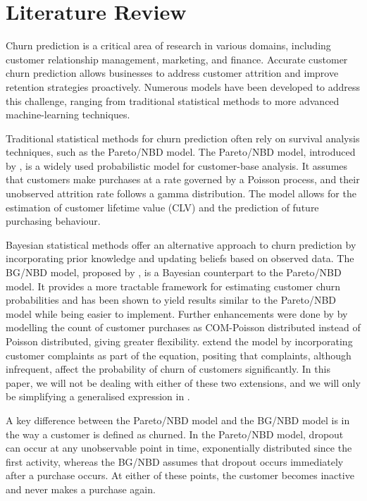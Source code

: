 \section{Literature Review}
Churn prediction is a critical area of research in various domains, including customer relationship management, marketing, and finance. Accurate customer churn prediction allows businesses to address customer attrition and improve retention strategies proactively. Numerous models have been developed to address this challenge, ranging from traditional statistical methods to more advanced machine-learning techniques.

Traditional statistical methods for churn prediction often rely on survival analysis techniques, such as the Pareto/NBD model. The Pareto/NBD model, introduced by \cite{schmittlein}, is a widely used probabilistic model for customer-base analysis. It assumes that customers make purchases at a rate governed by a Poisson process, and their unobserved attrition rate follows a gamma distribution. The model allows for the estimation of customer lifetime value (CLV) and the prediction of future purchasing behaviour.

Bayesian statistical methods offer an alternative approach to churn prediction by incorporating prior knowledge and updating beliefs based on observed data. The BG/NBD model, proposed by \cite{bgnbd_hardie}, is a Bayesian counterpart to the Pareto/NBD model. It provides a more tractable framework for estimating customer churn probabilities and has been shown to yield results similar to the Pareto/NBD model while being easier to implement. Further enhancements were done by \cite{bgnbd_improved} by modelling the count of customer purchases as COM-Poisson distributed instead of Poisson distributed, giving greater flexibility. \cite{bgnbd_complaints} extend the model by incorporating customer complaints as part of the equation, positing that complaints, although infrequent, affect the probability of churn of customers significantly. In this paper, we will not be dealing with either of these two extensions, and we will only be simplifying a generalised expression in \cite{bgnbd_hardie_notes}.

A key difference between the Pareto/NBD model and the BG/NBD model is in the way a customer is defined as churned. In the Pareto/NBD model, dropout can occur at any unobservable point in time, exponentially distributed since the first activity, whereas the BG/NBD assumes that dropout occurs immediately after a purchase occurs. At either of these points, the customer becomes inactive and never makes a purchase again.

